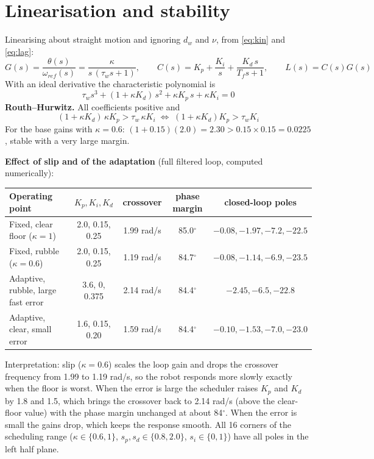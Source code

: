 \documentclass[11pt,a4paper]{article}
\begin{document}
\section{Linearisation and stability}
Linearising about straight motion and ignoring $d_w$ and $\nu$, from \eqref{eq:kin} and \eqref{eq:lag}:
\begin{equation}
G(s)=\frac{\theta(s)}{\omega_{ref}(s)}=\frac{\kappa}{s\,(\tau_w s+1)},\qquad C(s)=K_p+\frac{K_i}{s}+\frac{K_d\,s}{T_f s+1},\qquad L(s)=C(s)G(s)
\end{equation}
With an ideal derivative the characteristic polynomial is
\begin{equation}
\tau_w s^3+(1+\kappa K_d)\,s^2+\kappa K_p\,s+\kappa K_i=0
\end{equation}
\textbf{Routh--Hurwitz.} All coefficients positive and
\begin{equation}
(1+\kappa K_d)\,\kappa K_p>\tau_w\,\kappa K_i\;\Longleftrightarrow\;(1+\kappa K_d)K_p>\tau_w K_i
\end{equation}
For the base gains with $\kappa=0.6$: $(1+0.15)(2.0)=2.30>0.15\times0.15=0.0225$, stable with a very large margin.

\textbf{Effect of slip and of the adaptation} (full filtered loop, computed numerically):

\begin{center}
\small
\begin{tabular}{@{}p{5.2cm}cccc@{}}
\toprule
Operating point & $K_p,K_i,K_d$ & crossover & phase margin & closed-loop poles\\
\midrule
Fixed, clear floor ($\kappa=1$) & 2.0, 0.15, 0.25 & 1.99 rad/s & 85.0$^\circ$ & $-0.08,-1.97,-7.2,-22.5$\\
Fixed, rubble ($\kappa=0.6$) & 2.0, 0.15, 0.25 & 1.19 rad/s & 84.7$^\circ$ & $-0.08,-1.14,-6.9,-23.5$\\
Adaptive, rubble, large fast error & 3.6, 0, 0.375 & 2.14 rad/s & 84.4$^\circ$ & $-2.45,-6.5,-22.8$\\
Adaptive, clear, small error & 1.6, 0.15, 0.20 & 1.59 rad/s & 84.4$^\circ$ & $-0.10,-1.53,-7.0,-23.0$\\
\bottomrule
\end{tabular}
\end{center}

Interpretation: slip ($\kappa=0.6$) scales the loop gain and drops the crossover frequency from 1.99 to 1.19 rad/s, so the robot responds more slowly exactly when the floor is worst. When the error is large the scheduler raises $K_p$ and $K_d$ by 1.8 and 1.5, which brings the crossover back to 2.14 rad/s (above the clear-floor value) with the phase margin unchanged at about 84$^\circ$. When the error is small the gains drop, which keeps the response smooth. All 16 corners of the scheduling range ($\kappa\in\{0.6,1\}$, $s_p,s_d\in\{0.8,2.0\}$, $s_i\in\{0,1\}$) have all poles in the left half plane.
\end{document}
